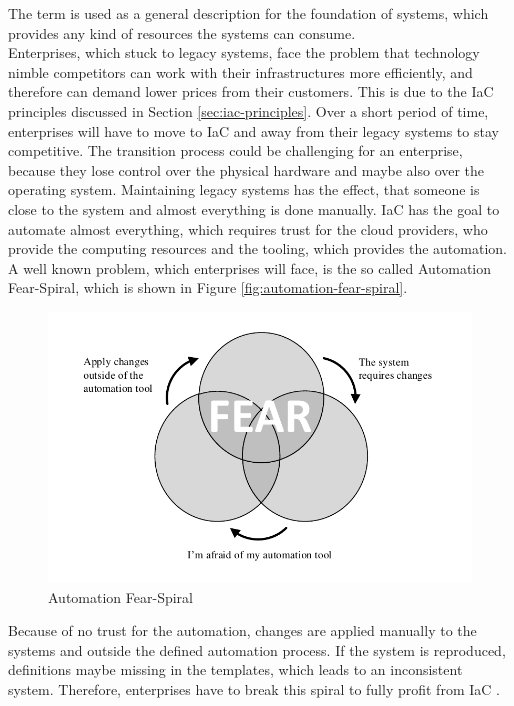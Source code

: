 The term  is used as a general description for the foundation of systems, which provides any kind of resources the systems can consume. \\

Enterprises, which stuck to legacy systems, face the problem that technology nimble competitors can work with their infrastructures more efficiently, and therefore can demand lower prices from their customers. This is due to the IaC principles discussed in Section \vref{sec:iac-principles}. Over a short period of time, enterprises will have to move to IaC and away from their legacy systems to stay competitive. The transition process could be challenging for an enterprise, because they lose control over the physical hardware and maybe also over the operating system. Maintaining legacy systems has the effect, that someone is close to the system and almost everything is done manually. IaC has the goal to automate almost everything, which requires trust for the cloud providers, who provide the computing resources and the tooling, which provides the automation. A well known problem, which enterprises will face, is the so called Automation Fear-Spiral, which is shown in Figure \vref{fig:automation-fear-spiral}.

\begin{figure}[htbp]
	\centering
	\includegraphics[scale=1]{images/automation-fear-spiral.pdf}
	\caption{Automation Fear-Spiral}
	\label{fig:automation-fear-spiral}
\end{figure} 

Because of no trust for the automation, changes are applied manually to the systems and outside the defined automation process. If the system is reproduced, definitions maybe missing in the templates, which leads to an inconsistent system. Therefore, enterprises have to break this spiral to fully profit from IaC \cite{Morris2016}. \\

